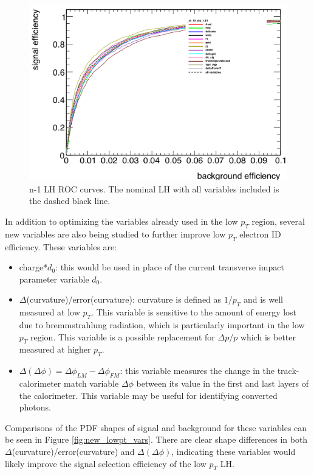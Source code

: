 \begin{figure}[h]
    \centering
    \includegraphics[width=5in]{figures/chapter5/n-1_studies.png}
    \caption{n-1 LH ROC curves. The nominal LH with all variables included is the dashed black line.}
    \label{fig:n-1_stud}
\end{figure}

In addition to optimizing the variables already used in the low $p_T$ region, several new variables are also being studied to further improve low $p_T$ electron ID efficiency. These variables are: 
\begin{itemize}
    \item charge*$d_0$: this would be used in place of the current transverse impact parameter variable $d_0$.
    \item $\Delta$(curvature)/error(curvature): curvature is defined as $1/p_T$ and is well measured at low $p_T$. This variable is sensitive to the amount of energy lost due to bremmstrahlung radiation, which is particularly important in the low $p_T$ region. This variable is a possible replacement for $\Delta p/p$ which is better measured at higher $p_T$.
    \item $\Delta(\Delta\phi)=\Delta\phi_{LM}-\Delta\phi_{FM}$: this variable measures the change in the track-calorimeter match variable $\Delta\phi$ between its value in the first and last layers of the calorimeter. This variable may be useful for identifying converted photons.
\end{itemize}
Comparisons of the PDF shapes of signal and background for these variables can be seen in Figure \ref{fig:new_lowpt_vars}. There are clear shape differences in both $\Delta$(curvature)/error(curvature) and $\Delta(\Delta\phi)$, indicating these variables would likely improve the signal selection efficiency of the low $p_T$ LH. 

